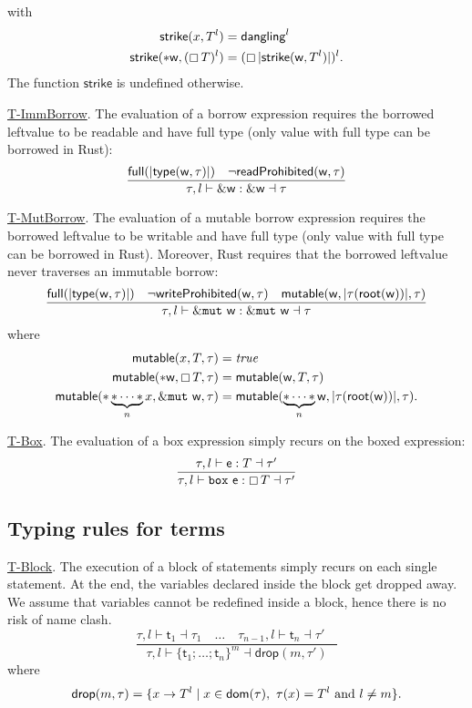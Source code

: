 with
\begin{align*}
  \mathsf{strike}(x,T^l)&=\mathsf{dangling}^l\\
  \mathsf{strike}(\mathtt{*}\mathsf{w},(\boxempty\,{T})^l)&=
  (\boxempty\,{|\mathsf{strike}(\mathsf{w},T^l)|})^l.
\end{align*}
The function $\mathsf{strike}$ is undefined otherwise.

\noindent
\underline{\textsf{T-ImmBorrow}}.
The evaluation of a borrow expression requires the borrowed leftvalue
to be readable and have full type
(only value with full type can be borrowed in Rust):
\[
\frac
    {\mathsf{full}(|\mathsf{type}(\mathsf{w},\tau)|)\quad\neg\mathsf{readProhibited}(\mathsf{w},\tau)}
    {\tau,l\vdash\&\mathsf{w}:\&\mathsf{w}\dashv\tau}
\]

\noindent
\underline{\textsf{T-MutBorrow}}.
The evaluation of a mutable borrow expression requires the borrowed
leftvalue to be writable and have full type
(only value with full type can be borrowed in Rust). Moreover, Rust requires that
the borrowed leftvalue never traverses an immutable borrow:
\[
\frac
    {\mathsf{full}(|\mathsf{type}(\mathsf{w},\tau)|)\quad\neg\mathsf{writeProhibited}(\mathsf{w},\tau)
    \quad\mathsf{mutable}(\mathsf{w},|\tau(\mathsf{root}(\mathsf{w}))|,\tau)}
    {\tau,l\vdash\&\mathtt{mut}\ \mathsf{w}:\&\mathtt{mut}\ \mathsf{w}\dashv\tau}
\]
where
\begin{align*}
  \mathsf{mutable}(x,T,\tau)&=\mathit{true}\\
  \mathsf{mutable}(\mathtt{*}\mathsf{w},\boxempty\,{T},\tau)&=\mathsf{mutable}(\mathsf{w},T,\tau)\\
  \mathsf{mutable}(\mathtt{*}\underbrace{\mathtt{*}\cdots\mathtt{*}}_nx,
  \&\mathtt{mut}\ \mathsf{w},\tau)&=\mathsf{mutable}(\underbrace{\mathtt{*}\cdots\mathtt{*}}_n\mathsf{w},
  |\tau(\mathsf{root}(\mathsf{w}))|,\tau).
\end{align*}

\noindent
\underline{\textsf{T-Box}}.
The evaluation of a box expression simply recurs on the boxed expression:
\[
\frac
    {\tau,l\vdash\mathsf{e}:T\dashv\tau'}
    {\tau,l\vdash\mathtt{box}\ \mathsf{e}:\boxtype{T}\dashv\tau'}
\]

\subsection{Typing rules for terms}

\noindent
\underline{\textsf{T-Block}}.
The execution of a block of statements simply recurs on each single statement.
At the end, the variables declared inside the block get dropped away. We assume
that variables cannot be redefined inside a block, hence there is no risk of name clash.
\[
\frac
    {\tau,l\vdash\mathsf{t}_1\dashv\tau_1\quad\ldots\quad\tau_{n-1},l\vdash\mathsf{t}_n\dashv\tau'
    \quad }
    {\tau,l\vdash\{\mathsf{t}_1;\ldots;\mathsf{t}_n\}^m\dashv\mathsf{drop}(m,\tau')}
\]
where
\[
\mathsf{drop}(m,\tau)=\{x\to T^l\mid x\in\mathsf{dom}(\tau),\ \tau(x)=T^l\text{ and }l\not=m\}.
\]

